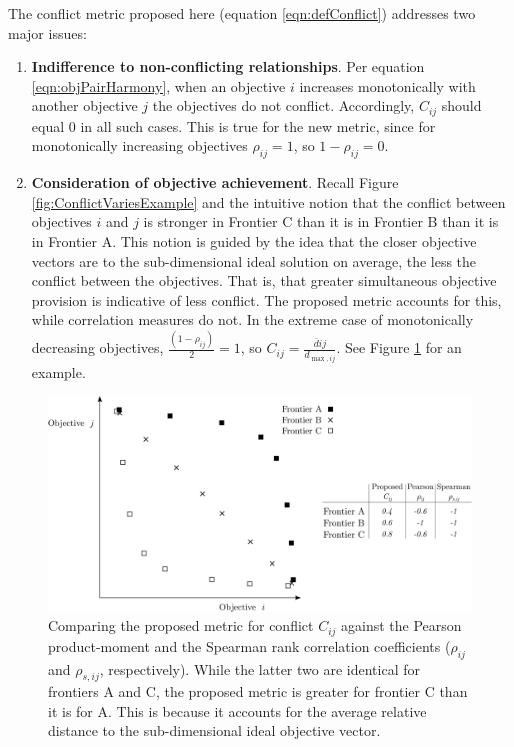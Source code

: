 The conflict metric proposed here (equation \eqref{eqn:defConflict}) addresses two major issues:
\begin{enumerate}
\item \textbf{Indifference to non-conflicting relationships}. Per equation \eqref{eqn:objPairHarmony}, when an objective $i$ increases monotonically with another objective $j$ the objectives do not conflict. Accordingly, $C_{ij}$ should equal 0 in all such cases. This is true for the new metric, since for monotonically increasing objectives $\rho_{ij} = 1$, so $1-\rho_{ij} = 0$.
\item \textbf{Consideration of objective achievement}. Recall Figure \ref{fig:ConflictVariesExample} and the intuitive notion that the conflict between objectives $i$ and $j$ is stronger in Frontier C than it is in Frontier B than it is in Frontier A. This notion is guided by the idea that the closer objective vectors are to the sub-dimensional ideal solution on average, the less the conflict between the objectives. That is, that greater simultaneous objective provision is indicative of less conflict. The proposed metric accounts for this, while correlation measures do not. In the extreme case of monotonically decreasing objectives, $\frac{(1-\rho_{ij})}{2} = 1$, so $C_{ij} = \frac{\overbar{d}{ij}}{d_{\max,ij}}$. See Figure \ref{fig:WhyOursIsBetter} for an example.
\end{enumerate}
\begin{figure}[ht]
\centering
\includegraphics[width=.9\textwidth]{../images/WhyOursIsBetter}
\caption[Comparing the proposed conflict metric to others used in multi-objective optimization]{Comparing the proposed metric for conflict $C_{ij}$ against the Pearson product-moment and the Spearman rank correlation coefficients ($\rho_{ij}$ and $\rho_{s,ij}$, respectively). While the latter two are identical for frontiers A and C, the proposed metric is greater for frontier C than it is for A. This is because it accounts for the average relative distance to the sub-dimensional ideal objective vector.}
\label{fig:WhyOursIsBetter}
\end{figure}

